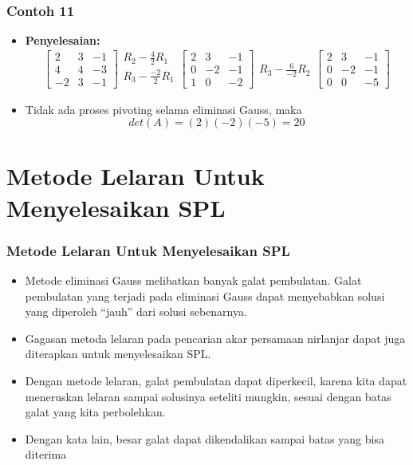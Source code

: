 \documentclass[pdflatex,compress,mathserif]{beamer}
\begin{document}
\begin{frame}
	\frametitle{Contoh 11}
	\begin{itemize}
		\item \textbf{Penyelesaian:}
		\[ \begin{bmatrix}
		2 & 3 & -1 \\ 4 & 4 & -3 \\ -2 & 3 & -1
		\end{bmatrix}
		\begin{matrix}
		R_2 - \frac{4}{2}R_1 \\
		R_3 - \frac{-2}{2}R_1 \\
		\end{matrix}
		\begin{bmatrix}
		2 & 3 & -1 \\ 0 & -2 & -1 \\ 1 & 0 & -2
		\end{bmatrix}
		\begin{matrix}
		R_3 - \frac{6}{-2}R_2
		\end{matrix}
		\begin{bmatrix}
		2 & 3 & -1 \\ 0 & -2 & -1 \\ 0 & 0 & -5
		\end{bmatrix}
		\]
		\item Tidak ada proses pivoting selama eliminasi Gauss, maka
		\[ det(A) = (2) (-2) (-5) = 20 \]
	\end{itemize}
\end{frame}

\section{Metode Lelaran Untuk Menyelesaikan SPL}

\begin{frame}
	\frametitle{Metode Lelaran Untuk Menyelesaikan SPL}
	\begin{itemize}
		\item Metode eliminasi Gauss melibatkan banyak galat pembulatan. Galat pembulatan yang terjadi pada eliminasi Gauss dapat menyebabkan solusi yang diperoleh “jauh” dari solusi sebenarnya.
		\item Gagasan metoda lelaran pada pencarian akar persamaan nirlanjar dapat juga diterapkan untuk menyelesaikan SPL.
		\item Dengan metode lelaran, galat pembulatan dapat diperkecil, karena kita dapat meneruskan lelaran sampai solusinya seteliti mungkin, sesuai dengan batas galat yang kita perbolehkan.
		\item Dengan kata lain, besar galat dapat dikendalikan sampai batas yang bisa diterima
	\end{itemize}
\end{frame}
\end{document}
